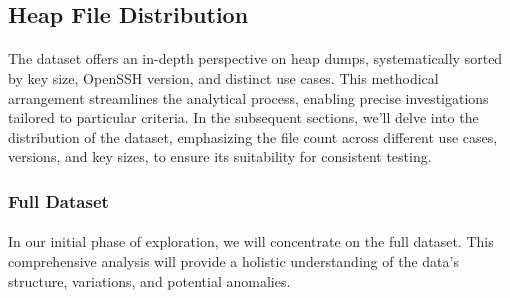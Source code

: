         

    \subsection{Heap File Distribution}

        
            
        \paragraph{}The dataset offers an in-depth perspective on heap dumps, systematically sorted by key size, OpenSSH version, and distinct use cases. This methodical arrangement streamlines the analytical process, enabling precise investigations tailored to particular criteria. In the subsequent sections, we'll delve into the distribution of the dataset, emphasizing the file count across different use cases, versions, and key sizes, to ensure its suitability for consistent testing.

        
        \subsubsection{Full Dataset}
            \paragraph{}In our initial phase of exploration, we will concentrate on the full dataset. This comprehensive analysis will provide a holistic understanding of the data's structure, variations, and potential anomalies.



